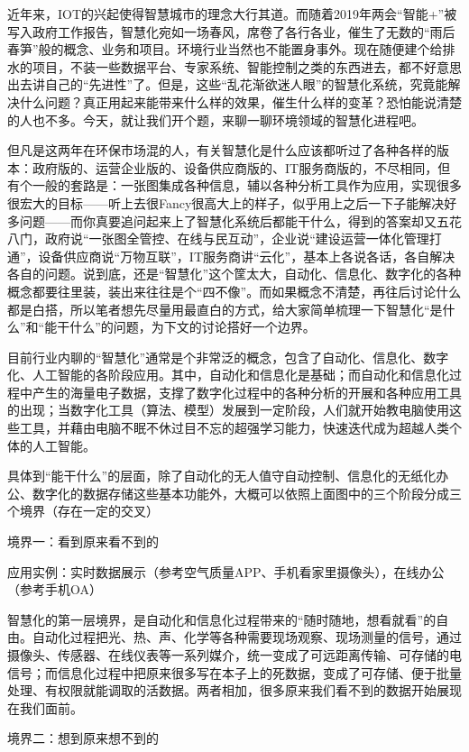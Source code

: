 \documentclass[
]{book}
\begin{document}
近年来，IOT的兴起使得智慧城市的理念大行其道。而随着2019年两会``智能+''被写入政府工作报告，智慧化宛如一场春风，席卷了各行各业，催生了无数的``雨后春笋''般的概念、业务和项目。环境行业当然也不能置身事外。现在随便建个给排水的项目，不装一些数据平台、专家系统、智能控制之类的东西进去，都不好意思出去讲自己的``先进性''了。但是，这些``乱花渐欲迷人眼''的智慧化系统，究竟能解决什么问题？真正用起来能带来什么样的效果，催生什么样的变革？恐怕能说清楚的人也不多。今天，就让我们开个题，来聊一聊环境领域的智慧化进程吧。

但凡是这两年在环保市场混的人，有关智慧化是什么应该都听过了各种各样的版本：政府版的、运营企业版的、设备供应商版的、IT服务商版的，不尽相同，但有个一般的套路是：一张图集成各种信息，辅以各种分析工具作为应用，实现很多很宏大的目标------听上去很Fancy很高大上的样子，似乎用上之后一下子能解决好多问题------而你真要追问起来上了智慧化系统后都能干什么，得到的答案却又五花八门，政府说``一张图全管控、在线与民互动''，企业说``建设运营一体化管理打通''，设备供应商说``万物互联''，IT服务商讲``云化''，基本上各说各话，各自解决各自的问题。说到底，还是``智慧化''这个筐太大，自动化、信息化、数字化的各种概念都要往里装，装出来往往是个``四不像''。而如果概念不清楚，再往后讨论什么都是白搭，所以笔者想先尽量用最直白的方式，给大家简单梳理一下智慧化``是什么''和``能干什么''的问题，为下文的讨论搭好一个边界。

目前行业内聊的``智慧化''通常是个非常泛的概念，包含了自动化、信息化、数字化、人工智能的各阶段应用。其中，自动化和信息化是基础；而自动化和信息化过程中产生的海量电子数据，支撑了数字化过程中的各种分析的开展和各种应用工具的出现；当数字化工具（算法、模型）发展到一定阶段，人们就开始教电脑使用这些工具，并藉由电脑不眠不休过目不忘的超强学习能力，快速迭代成为超越人类个体的人工智能。

具体到``能干什么''的层面，除了自动化的无人值守自动控制、信息化的无纸化办公、数字化的数据存储这些基本功能外，大概可以依照上面图中的三个阶段分成三个境界（存在一定的交叉）

境界一：看到原来看不到的

应用实例：实时数据展示（参考空气质量APP、手机看家里摄像头），在线办公（参考手机OA）

智慧化的第一层境界，是自动化和信息化过程带来的``随时随地，想看就看''的自由。自动化过程把光、热、声、化学等各种需要现场观察、现场测量的信号，通过摄像头、传感器、在线仪表等一系列媒介，统一变成了可远距离传输、可存储的电信号；而信息化过程中把原来很多写在本子上的死数据，变成了可存储、便于批量处理、有权限就能调取的活数据。两者相加，很多原来我们看不到的数据开始展现在我们面前。

境界二：想到原来想不到的
\end{document}
